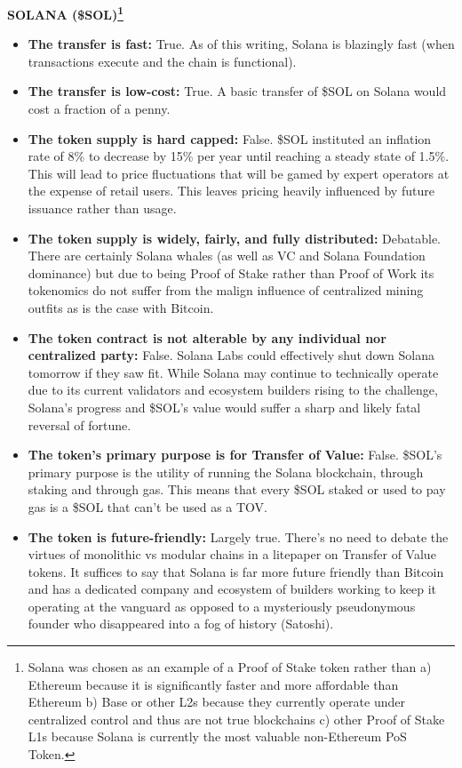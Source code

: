 \documentclass{article}
\begin{document}
\textbf{SOLANA (\$SOL)\footnote{Solana was chosen as an example of a Proof of Stake token rather than a) Ethereum because it is significantly faster and more affordable than Ethereum b) Base or other L2s because they currently operate under centralized control and thus are not true blockchains c) other Proof of Stake L1s because Solana is currently the most valuable non-Ethereum PoS Token.}}

\begin{itemize}
\item \textbf{The transfer is fast:} True. As of this writing, Solana is blazingly fast (when transactions execute and the chain is functional).
\item \textbf{The transfer is low-cost:} True. A basic transfer of \$SOL on Solana would cost a fraction of a penny.
\item \textbf{The token supply is hard capped:} False. \$SOL instituted an inflation rate of 8\% to decrease by 15\% per year until reaching a steady state of 1.5\%. This will lead to price fluctuations that will be gamed by expert operators at the expense of retail users. This leaves pricing heavily influenced by future issuance rather than usage.
\item \textbf{The token supply is widely, fairly, and fully distributed:} Debatable. There are certainly Solana whales (as well as VC and Solana Foundation dominance) but due to being Proof of Stake rather than Proof of Work its tokenomics do not suffer from the malign influence of centralized mining outfits as is the case with Bitcoin.
\item \textbf{The token contract is not alterable by any individual nor centralized party:} False. Solana Labs could effectively shut down Solana tomorrow if they saw fit. While Solana may continue to technically operate due to its current validators and ecosystem builders rising to the challenge, Solana's progress and \$SOL's value would suffer a sharp and likely fatal reversal of fortune.
\item \textbf{The token's primary purpose is for Transfer of Value:} False. \$SOL's primary purpose is the utility of running the Solana blockchain, through staking and through gas. This means that every \$SOL staked or used to pay gas is a \$SOL that can't be used as a TOV.
\item \textbf{The token is future-friendly:} Largely true. There's no need to debate the virtues of monolithic vs modular chains in a litepaper on Transfer of Value tokens. It suffices to say that Solana is far more future friendly than Bitcoin and has a dedicated company and ecosystem of builders working to keep it operating at the vanguard as opposed to a mysteriously pseudonymous founder who disappeared into a fog of history (Satoshi).
\end{itemize}
\end{document}
